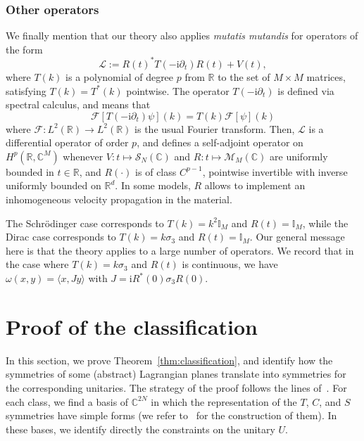 \documentclass[11pt]{amsart}
\numberwithin{equation}{section} %
\newcommand\1{{\mathds 1}}
\def\C{{\mathbb C}}
\def\bbI{{\mathbb I}}
\def\R{{\mathbb R}}
\def\ri{{\mathrm{i}}}
\def\cF{{\mathcal F}}
\def\cL{{\mathcal L}}
\def\cM{{\mathcal M}}
\def\cS{{\mathcal S}}
\def\bra{\langle}
\def\ket{\rangle}
\begin{document}
\subsubsection{Other operators} We finally mention that our theory also applies {\em mutatis mutandis} for operators of the form 
\[
    \cL := R(t)^* T(- \ri \partial_t) R(t) + V(t),
\] 
where $T(k)$ is a polynomial of degree $p$ from $\R$ to the set of $M \times M$ matrices, satisfying $T(k) = T^*(k)$ pointwise. The operator $T( - \ri \partial_t)$ is defined via spectral calculus, and means that
\[
    \cF \left[ T( - \ri \partial_t) \psi\right](k) = T(k) \cF[\psi](k)
\]
where $\cF : L^2(\R) \to L^2(\R)$ is the usual Fourier transform. Then, $\cL$ is a differential operator of order $p$, and defines a self-adjoint operator on $H^p(\R, \C^M)$ whenever $V : t \mapsto \cS_N(\C)$ and $R : t \mapsto \cM_M(\C)$ are uniformly bounded in $t \in \R$, and $R(\cdot)$ is of class $C^{p-1}$, pointwise invertible with inverse uniformly bounded on $\R^d$. In some models, $R$ allows to implement an inhomogeneous velocity propagation in the material. 

The Schrödinger case corresponds to $T(k) = k^2 \bbI_M$ and $R(t) = \bbI_M$, while the Dirac case corresponds to $T(k) = k \sigma_3$ and $R(t) = \bbI_M$. Our general message here is that the theory applies to a large number of operators. We record that in the case where $T(k) = k \sigma_3$ and $R(t)$ is continuous, we have $\omega(x, y) = \bra x, J y \ket$ with $J = \ri R^*(0) \sigma_3 R(0)$.




\section{Proof of the classification}
\label{sec:classification}

In this section, we prove Theorem~\ref{thm:classification}, and identify how the symmetries of some (abstract) Lagrangian planes translate into symmetries for the corresponding unitaries. The strategy of the proof follows the lines of~\cite{GonMonPer-22}. For each class, we find a basis of $\C^{2N}$ in which the representation of the $T$, $C$, and $S$ symmetries have simple forms (we refer to~\cite{GonMonPer-22} for the construction of them). In these bases, we identify directly the constraints on the unitary $U$. 

\medskip
\end{document}
